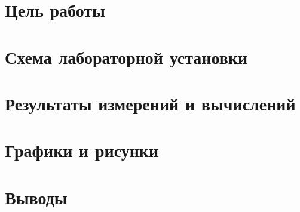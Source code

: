 





\newpage
\section{Цель работы}
\label{sec:target}

\newpage
\section{Схема лабораторной установки}
\label{sec:schema}

\newpage
\section{Результаты измерений и вычислений}
\label{sec:results}
%

\newpage
\section{Графики и рисунки}
\label{sec:plots}
%

\newpage
\section{Выводы} %
\label{sec:reasons}


